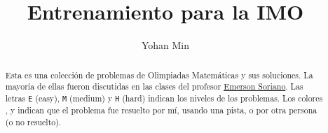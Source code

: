 \documentclass[11pt]{scrartcl}
\title{Entrenamiento para la IMO}
\author{Yohan Min}
\begin{document}
\maketitle

\begin{abstract}
	Esta es una colección de problemas de Olimpiadas Matemáticas y sus soluciones. La mayoría de ellas fueron discutidas en las clases del profesor \href{https://www.facebook.com/emerson.sorianoperez}{Emerson Soriano}. Las letras \verb|E| (easy), \verb|M| (medium) y \verb|H| (hard) indican los niveles de los problemas. Los colores ,  y  indican que el problema fue resuelto por mí, usando una pista, o por otra persona (o no resuelto).
\end{abstract}

\tableofcontents








\end{document}
